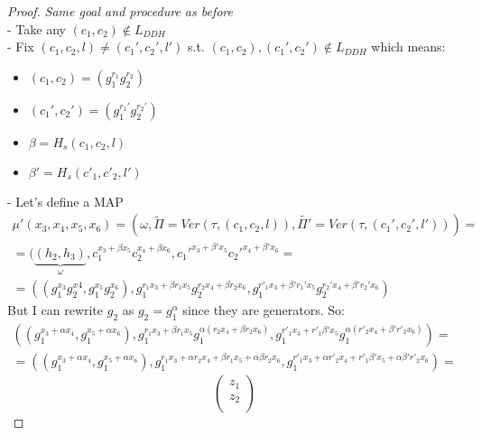 \begin{proof}
    \textit{Same goal and procedure as before}\\
    - Take any $(c_1,c_2) \notin L_{DDH}$\\
    - Fix $(c_1,c_2,l)\neq (c_1',c_2',l')$ s.t. $(c_1,c_2),(c_1',c_2')\notin L_{DDH}$ which means:
    \begin{itemize}
        \item $(c_1,c_2)=(g_1^{r_1}g_2^{r_2})$ 
        \item $(c_1',c_2')=(g_1^{r_1'}g_2^{r_2'})$ 
        \item $\beta=H_s(c_1,c_2,l)$
        \item $\beta'=H_s(c'_1,c'_2,l')$
    \end{itemize}
    - Let's define a MAP
    \begin{gather*}
        \mu'(x_3,x_4,x_5,x_6)=(\omega, \widetilde{\Pi}=Ver(\tau,(c_1,c_2,l)),\widetilde{\Pi'}=Ver(\tau,(c_1',c_2',l')))= \\
        =(\underbrace{(h_2,h_3)}_{\omega},c_1^{x_3+\beta x_5}c_2^{x_4+\beta x_6},c_1'^{x_3+\beta'x_5}c_2'^{x_4+\beta'x_6}= \\
        =((g_1^{x_3}g_2^{x4},g_1^{x_5}g_2^{x_6}),g_1^{r_1x_3+\beta r_1x_5}g_2^{r_2x_4+\beta r_2x_6},g_1^{r'_1x_3+\beta' r_1'x_5}g_2^{r_2'x_4+\beta'r_2'x_6})
    \end{gather*}
    But I can rewrite $g_2$ as $g_2=g_1^{\alpha}$ since they are generators. So:
    \begin{gather*}
        ((g_1^{x_3+\alpha x_4},g_1^{x_5+\alpha x_6}),g_1^{r_1x_3+\beta r_1x_5}g_1^{\alpha(r_2x_4+\beta r_2x_6)},g_1^{r'_1x_3+r'_1\beta' x_5}g_1^{\alpha(r'_2x_4+\beta' r'_2x_6)})=\\
        = ((g_1^{x_3+\alpha x_4},g_1^{x_5+\alpha x_6}),g_1^{r_1x_3+\alpha r_2x_4+\beta r_1x_5 +\alpha\beta r_2x_6},g_1^{r'_1x_3+ \alpha r'_2x_4 +r'_1\beta' x_5 + \alpha\beta' r'_2x_6})=
    \end{gather*}
    \[
        \begin{pmatrix}
            z_1\\
            z_2\\

\end{pmatrix}\]
\end{proof}
